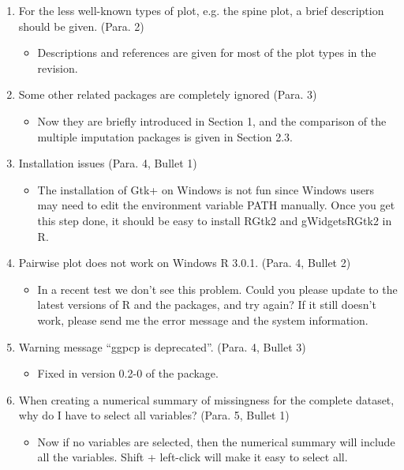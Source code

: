 \documentclass[12pt,english]{article}
\begin{document}
\begin{enumerate}
\item For the less well-known types of plot, e.g. the spine plot, a brief
description should be given. (Para. 2)
\begin{itemize}
\item Descriptions and references are given for most of the plot types in
the revision.
\end{itemize}

\item Some other related packages are completely ignored (Para. 3)
\begin{itemize}
\item Now they are briefly introduced in Section 1, and the comparison of
the multiple imputation packages is given in Section 2.3.
\end{itemize}

\item Installation issues (Para. 4, Bullet 1)
\begin{itemize}
\item The installation of Gtk+ on Windows is not fun since Windows users
may need to edit the environment variable PATH manually. Once you
get this step done, it should be easy to install RGtk2 and gWidgetsRGtk2
in R.
\end{itemize}

\item Pairwise plot does not work on Windows R 3.0.1. (Para. 4, Bullet 2)
\begin{itemize}
\item In a recent test we don't see this problem. Could you please update
to the latest versions of R and the packages, and try again? If it
still doesn't work, please send me the error message and the system
information.
\end{itemize}

\item Warning message ``ggpcp is deprecated''. (Para. 4, Bullet 3)
\begin{itemize}
\item Fixed in version 0.2-0 of the package.
\end{itemize}

\item When creating a numerical summary of missingness for the complete
dataset, why do I have to select all variables? (Para. 5, Bullet 1)
\begin{itemize}
\item Now if no variables are selected, then the numerical summary will
include all the variables. Shift + left-click will make it easy to
select all.
\end{itemize}


\end{enumerate}
\end{document}
